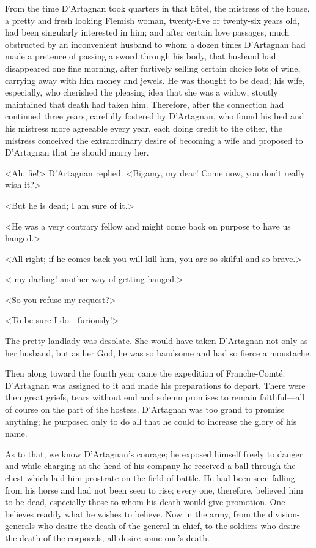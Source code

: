 From the time D'Artagnan took quarters in that hôtel, the mistress of the house, a pretty and fresh looking Flemish woman, twenty-five or twenty-six years old, had been singularly interested in him; and after certain love passages, much obstructed by an inconvenient husband to whom a dozen times D'Artagnan had made a pretence of passing a sword through his body, that husband had disappeared one fine morning, after furtively selling certain choice lots of wine, carrying away with him money and jewels. He was thought to be dead; his wife, especially, who cherished the pleasing idea that she was a widow, stoutly maintained that death had taken him. Therefore, after the connection had continued three years, carefully fostered by D'Artagnan, who found his bed and his mistress more agreeable every year, each doing credit to the other, the mistress conceived the extraordinary desire of becoming a wife and proposed to D'Artagnan that he should marry her.

<Ah, fie!> D'Artagnan replied. <Bigamy, my dear! Come now, you don't really wish it?>

<But he is dead; I am sure of it.>

<He was a very contrary fellow and might come back on purpose to have us hanged.>

<All right; if he comes back you will kill him, you are so skilful and so brave.>

< my darling! another way of getting hanged.>

<So you refuse my request?>

<To be sure I do—furiously!>

The pretty landlady was desolate. She would have taken D'Artagnan not only as her husband, but as her God, he was so handsome and had so fierce a moustache.

Then along toward the fourth year came the expedition of Franche-Comté. D'Artagnan was assigned to it and made his preparations to depart. There were then great griefs, tears without end and solemn promises to remain faithful—all of course on the part of the hostess. D'Artagnan was too grand to promise anything; he purposed only to do all that he could to increase the glory of his name.

As to that, we know D'Artagnan's courage; he exposed himself freely to danger and while charging at the head of his company he received a ball through the chest which laid him prostrate on the field of battle. He had been seen falling from his horse and had not been seen to rise; every one, therefore, believed him to be dead, especially those to whom his death would give promotion. One believes readily what he wishes to believe. Now in the army, from the division-generals who desire the death of the general-in-chief, to the soldiers who desire the death of the corporals, all desire some one's death.

